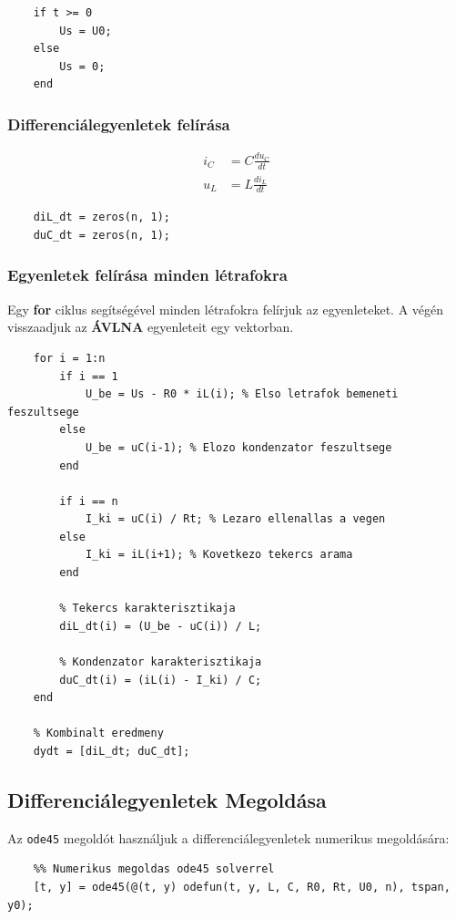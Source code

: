 \documentclass[12pt,a4paper]{article}
\begin{document}
\begin{lstlisting}
    if t >= 0
        Us = U0;
    else
        Us = 0;
    end
\end{lstlisting}

\subsubsection{Differenciálegyenletek felírása}
\[
\begin{aligned}
    i_C &= C \frac{du_C}{dt} \\
    u_L &= L \frac{di_L}{dt}
\end{aligned}
\]
\begin{lstlisting}
    diL_dt = zeros(n, 1);
    duC_dt = zeros(n, 1);
\end{lstlisting}

\pagebreak

\subsubsection{Egyenletek felírása minden létrafokra}
Egy \textbf{for} ciklus segítségével minden létrafokra felírjuk az egyenleteket. A végén visszaadjuk az \textbf{ÁVLNA} egyenleteit egy vektorban.

\begin{lstlisting}
    for i = 1:n
        if i == 1
            U_be = Us - R0 * iL(i); % Elso letrafok bemeneti feszultsege
        else
            U_be = uC(i-1); % Elozo kondenzator feszultsege
        end
        
        if i == n
            I_ki = uC(i) / Rt; % Lezaro ellenallas a vegen
        else
            I_ki = iL(i+1); % Kovetkezo tekercs arama
        end
        
        % Tekercs karakterisztikaja
        diL_dt(i) = (U_be - uC(i)) / L;
        
        % Kondenzator karakterisztikaja
        duC_dt(i) = (iL(i) - I_ki) / C;
    end

    % Kombinalt eredmeny
    dydt = [diL_dt; duC_dt];
\end{lstlisting}

\subsection*{Differenciálegyenletek Megoldása}

Az \texttt{ode45} megoldót használjuk a differenciálegyenletek numerikus megoldására:

\begin{lstlisting}
    %% Numerikus megoldas ode45 solverrel
    [t, y] = ode45(@(t, y) odefun(t, y, L, C, R0, Rt, U0, n), tspan, y0);
\end{lstlisting}
\end{document}
